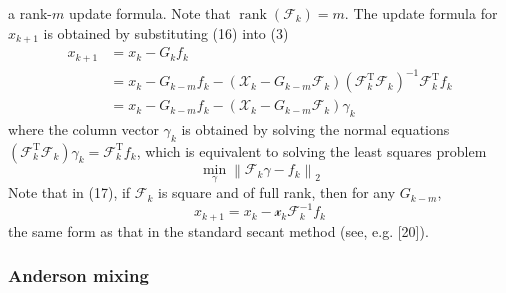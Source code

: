 a rank-\(m\) update formula. 
Note that \(\operatorname{rank}\left(\mathscr{F}_{k}\right)=m\).
The update formula for \(x_{k+1}\) is obtained by substituting (16) into (3)
\begin{align}
x_{k+1} &=x_{k}-G_{k} f_{k} \\
&=x_{k}-G_{k-m} f_{k}-\left(\mathscr{X}_{k}-G_{k-m} \mathscr{F}_{k}\right)\left(\mathscr{F}_{k}^{\mathrm{T}} \mathscr{F}_{k}\right)^{-1} \mathscr{F}_{k}^{\mathrm{T}} f_{k} \\
&=x_{k}-G_{k-m} f_{k}-\left(\mathscr{X}_{k}-G_{k-m} \mathscr{F}_{k}\right) \gamma_{k}
\end{align}
where the column vector \(\gamma_{k}\) is obtained by solving the normal equations \(\left(\mathscr{F}_{k}^{\mathrm{T}} \mathscr{F}_{k}\right) \gamma_{k}=\mathscr{F}_{k}^{\mathrm{T}} f_{k}\), which is equivalent to solving the least squares problem
\begin{equation}
  \min _{\gamma}\left\|\mathscr{F}_{k} \gamma-f_{k}\right\|_{2}
\end{equation}
Note that in (17), if \(\mathscr{F}_{k}\) is square and of full rank, then for any \(G_{k-m}\),
\begin{equation}
  x_{k+1}=x_{k}-\mathscr{x}_{k} \mathscr{F}_{k}^{-1} f_{k}
\end{equation}
the same form as that in the standard secant method (see, e.g. [20]).

\subsubsection{Anderson mixing}

